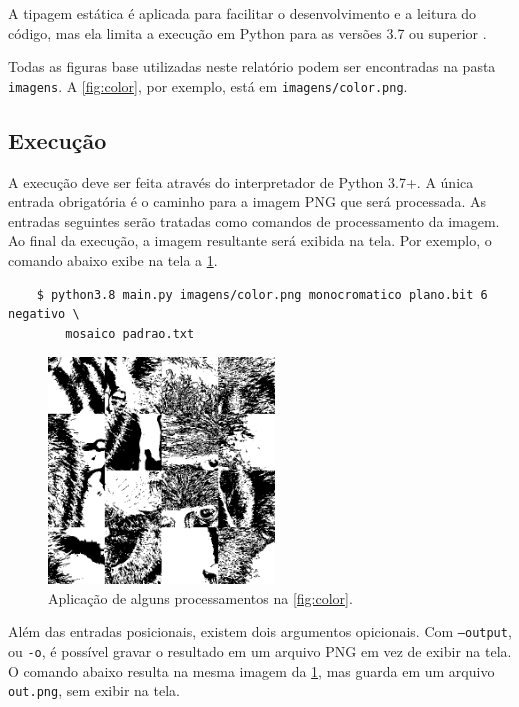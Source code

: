 A tipagem estática é aplicada para facilitar o desenvolvimento e a leitura do código, mas ela limita a execução em Python para as versões 3.7 ou superior \autocite{ref:pep563}.

Todas as figuras base utilizadas neste relatório podem ser encontradas na pasta \texttt{imagens}. A \cref{fig:color}, por exemplo, está em \texttt{imagens/color.png}.

\subsection{Execução}

A execução deve ser feita através do interpretador de Python 3.7+. A única entrada obrigatória é o caminho para a imagem PNG que será processada. As entradas seguintes serão tratadas como comandos de processamento da imagem. Ao final da execução, a imagem resultante será exibida na tela. Por exemplo, o comando abaixo exibe na tela a \cref{fig:execucao}.

\begin{verbatim}
    $ python3.8 main.py imagens/color.png monocromatico plano.bit 6 negativo \
        mosaico padrao.txt
\end{verbatim}

\begin{figure}[H]
    \centering
    \includegraphics[width=6cm]{resultados/execucao.png}

    \caption{Aplicação de alguns processamentos na \cref{fig:color}.}
    \label{fig:execucao}
\end{figure}

Além das entradas posicionais, existem dois argumentos opicionais. Com \texttt{--output}, ou \texttt{-o}, é possível gravar o resultado em um arquivo PNG em vez de exibir na tela. O comando abaixo resulta na mesma imagem da \cref{fig:execucao}, mas guarda em um arquivo \texttt{out.png}, sem exibir na tela.

